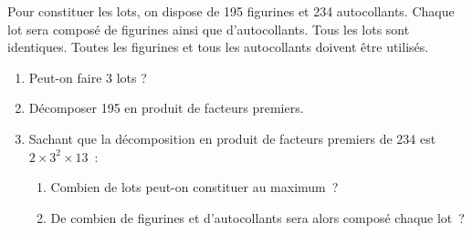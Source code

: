 \documentclass[exercice]{thedocument}%
\begin{document}
%
    Pour constituer les lots, on dispose de 195 figurines et 234 autocollants.
    Chaque lot sera composé de figurines ainsi que d'autocollants. Tous les
    lots sont identiques. Toutes les figurines et tous les autocollants doivent
    être utilisés.
    \begin{enumerate}
        \item Peut-on faire 3 lots ?  
        \item Décomposer 195 en produit de facteurs premiers. 
        \item Sachant que la décomposition en produit de facteurs premiers de 234
        est $2\times3^2\times13$~: 
        \begin{enumerate}
            \item Combien de lots peut-on constituer au maximum~? 
            \item De combien de figurines et d'autocollants sera alors composé
            chaque lot~?
        \end{enumerate}
    \end{enumerate}
\end{document}
